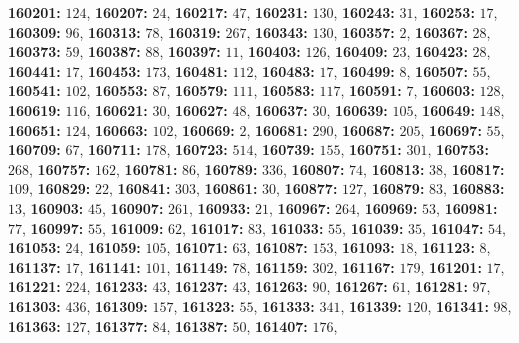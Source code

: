 \textsf{\bfseries 160201:} $124$, \textsf{\bfseries 160207:} $24$, \textsf{\bfseries 160217:} $47$, \textsf{\bfseries 160231:} $130$, \textsf{\bfseries 160243:} $31$, \textsf{\bfseries 160253:} $17$, \textsf{\bfseries 160309:} $96$, \textsf{\bfseries 160313:} $78$, \textsf{\bfseries 160319:} $267$, \textsf{\bfseries 160343:} $130$, \textsf{\bfseries 160357:} $2$, \textsf{\bfseries 160367:} $28$, \textsf{\bfseries 160373:} $59$, \textsf{\bfseries 160387:} $88$, \textsf{\bfseries 160397:} $11$, \textsf{\bfseries 160403:} $126$, \textsf{\bfseries 160409:} $23$, \textsf{\bfseries 160423:} $28$, \textsf{\bfseries 160441:} $17$, \textsf{\bfseries 160453:} $173$, \textsf{\bfseries 160481:} $112$, \textsf{\bfseries 160483:} $17$, \textsf{\bfseries 160499:} $8$, \textsf{\bfseries 160507:} $55$, \textsf{\bfseries 160541:} $102$, \textsf{\bfseries 160553:} $87$, \textsf{\bfseries 160579:} $111$, \textsf{\bfseries 160583:} $117$, \textsf{\bfseries 160591:} $7$, \textsf{\bfseries 160603:} $128$, \textsf{\bfseries 160619:} $116$, \textsf{\bfseries 160621:} $30$, \textsf{\bfseries 160627:} $48$, \textsf{\bfseries 160637:} $30$, \textsf{\bfseries 160639:} $105$, \textsf{\bfseries 160649:} $148$, \textsf{\bfseries 160651:} $124$, \textsf{\bfseries 160663:} $102$, \textsf{\bfseries 160669:} $2$, \textsf{\bfseries 160681:} $290$, \textsf{\bfseries 160687:} $205$, \textsf{\bfseries 160697:} $55$, \textsf{\bfseries 160709:} $67$, \textsf{\bfseries 160711:} $178$, \textsf{\bfseries 160723:} $514$, \textsf{\bfseries 160739:} $155$, \textsf{\bfseries 160751:} $301$, \textsf{\bfseries 160753:} $268$, \textsf{\bfseries 160757:} $162$, \textsf{\bfseries 160781:} $86$, \textsf{\bfseries 160789:} $336$, \textsf{\bfseries 160807:} $74$, \textsf{\bfseries 160813:} $38$, \textsf{\bfseries 160817:} $109$, \textsf{\bfseries 160829:} $22$, \textsf{\bfseries 160841:} $303$, \textsf{\bfseries 160861:} $30$, \textsf{\bfseries 160877:} $127$, \textsf{\bfseries 160879:} $83$, \textsf{\bfseries 160883:} $13$, \textsf{\bfseries 160903:} $45$, \textsf{\bfseries 160907:} $261$, \textsf{\bfseries 160933:} $21$, \textsf{\bfseries 160967:} $264$, \textsf{\bfseries 160969:} $53$, \textsf{\bfseries 160981:} $77$, \textsf{\bfseries 160997:} $55$, \textsf{\bfseries 161009:} $62$, \textsf{\bfseries 161017:} $83$, \textsf{\bfseries 161033:} $55$, \textsf{\bfseries 161039:} $35$, \textsf{\bfseries 161047:} $54$, \textsf{\bfseries 161053:} $24$, \textsf{\bfseries 161059:} $105$, \textsf{\bfseries 161071:} $63$, \textsf{\bfseries 161087:} $153$, \textsf{\bfseries 161093:} $18$, \textsf{\bfseries 161123:} $8$, \textsf{\bfseries 161137:} $17$, \textsf{\bfseries 161141:} $101$, \textsf{\bfseries 161149:} $78$, \textsf{\bfseries 161159:} $302$, \textsf{\bfseries 161167:} $179$, \textsf{\bfseries 161201:} $17$, \textsf{\bfseries 161221:} $224$, \textsf{\bfseries 161233:} $43$, \textsf{\bfseries 161237:} $43$, \textsf{\bfseries 161263:} $90$, \textsf{\bfseries 161267:} $61$, \textsf{\bfseries 161281:} $97$, \textsf{\bfseries 161303:} $436$, \textsf{\bfseries 161309:} $157$, \textsf{\bfseries 161323:} $55$, \textsf{\bfseries 161333:} $341$, \textsf{\bfseries 161339:} $120$, \textsf{\bfseries 161341:} $98$, \textsf{\bfseries 161363:} $127$, \textsf{\bfseries 161377:} $84$, \textsf{\bfseries 161387:} $50$, \textsf{\bfseries 161407:} $176$, 
